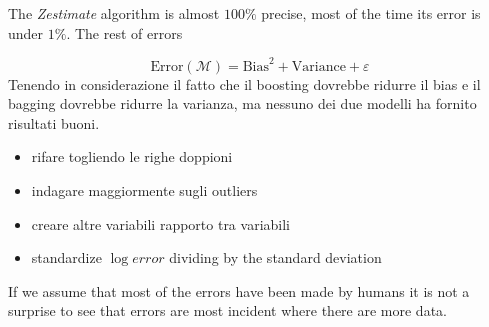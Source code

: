 The \textit{Zestimate} algorithm is almost $100\%$ precise, most of the time its error is under $1\%$. The rest of errors  

$$\text{Error}(\mathcal{M} ) = \text{Bias}^2 + \text{Variance} + \varepsilon$$
Tenendo in considerazione il fatto che il boosting dovrebbe ridurre il bias e il bagging dovrebbe ridurre la varianza, ma nessuno dei due modelli ha fornito risultati buoni.

\begin{itemize}
  \item rifare togliendo le righe doppioni
  \item indagare maggiormente sugli outliers
  \item creare altre variabili rapporto tra variabili
  \item standardize $\log error$ dividing by the standard deviation
\end{itemize}

If we assume that most of the errors have been made by humans it is not a surprise to see that errors are most incident where there are more data.